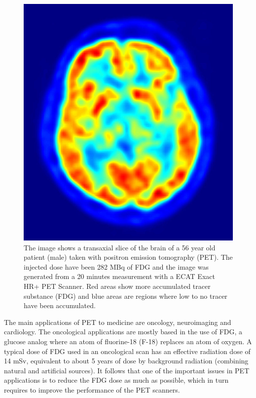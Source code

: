 \begin{figure}[!bthp]
	\centering
	\includegraphics[scale=2.0]{img/800px-PET-image.jpg}
	\caption{\label{fig.brain} The image shows a transaxial slice of the brain of a 56 year old patient (male) taken with positron emission tomography (PET). The injected dose have been 282 MBq of FDG and the image was generated from a 20 minutes measurement with a ECAT Exact HR+ PET Scanner. Red areas show more accumulated tracer substance (FDG) and blue areas are regions where low to no tracer have been accumulated.}
\end{figure}

The main applications of PET to medicine are oncology, neuroimaging and cardiology. The oncological applications are mostly based in the use of FDG, a glucose analog where an atom of fluorine-18 (F-18) replaces an atom of oxygen. A typical dose of FDG used in an oncological scan has an effective radiation dose of 14 mSv, equivalent to about 5 years of dose by background radiation (combining natural and artificial sources). It follows that one of the important issues in PET applications is to reduce the FDG dose as much as possible, which in turn requires to improve the performance of the PET scanners.

